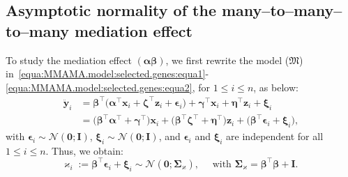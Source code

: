\documentclass[
  12pt]{article}
\def\X{\mathbf{x}}
\def\Z{\mathbf{z}}
\begin{document}
\subsection{Asymptotic normality of the many--to--many--to--many mediation effect}
To study the mediation effect $(\bm{\alpha} \bm{\beta})$, we first rewrite the model ($\mathfrak{M}$) in~\eqref{equa:MMAMA.model:selected.genes:equa1}-\eqref{equa:MMAMA.model:selected.genes:equa2}, for $1 \leq i \leq n$, as below:
\begin{align}
	\ddot{\mathbf{y}}_{i}  &=  { \bm{\beta}}^{\top} \Big(  {\bm{\alpha}}^{\top}\X_{i}  +   \bm{\zeta}^{\top} \Z_{i}  +  \bm{\epsilon}_{i}  \Big)  +     \bm{\gamma}^{\top} \X_{i}  +     \bm{\eta}^{\top} \Z_{i} +  \bm{\xi}_{i}
	\nonumber
	\\
	&=    \Big( \bm{\beta}^{\top} \bm{\alpha}^{\top}    +  \bm{\gamma}^{\top} \Big) { \X_{i} }
	+    \Big(  \bm{\beta}^{\top} \bm{\zeta}^{\top}     +   \bm{\eta}^{\top}  \Big) \Z_{i}  +  \Big( \bm{\beta}^{\top} \bm{\epsilon}_{i}  +  { \bm{\xi} }_{i}  \Big) ,
\end{align}
with $ \bm{\epsilon}_{i}   {\sim} \mathcal{N}(\bm{0} ; \mathbf{I}) $, $ \bm{\xi}_{i}  {\sim} \mathcal{N}(\bm{0} ; \mathbf{I})$, and $ \bm{\epsilon}_{i} $ and $\bm{\xi}_{i}$ are independent for all $1 \leq i \leq n$. Thus, %
we obtain:
\[
\varkappa_{i} := \bm{\beta}^{\top} \bm{\epsilon}_{i}   +  \bm{\xi}_{i}
{\sim} \mathcal{N}(\bm{0} ;  \bm{\Sigma}_{\varkappa})  ,
\quad
\textrm{ with $\bm{\Sigma}_{\varkappa}= \bm{\beta}^{\top}\bm{\beta}  + \mathbf{I}$. }
\]
\end{document}
